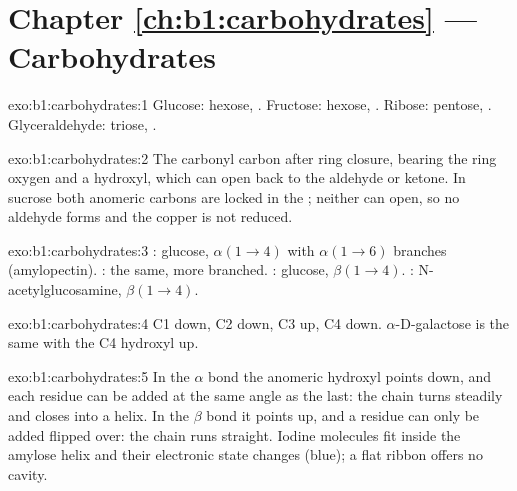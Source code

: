 \section*{Chapter \ref{ch:b1:carbohydrates} --- Carbohydrates}

\begin{solution}{exo:b1:carbohydrates:1}
Glucose: hexose, . Fructose: hexose, . Ribose: pentose,
. Glyceraldehyde: triose, .
\end{solution}

\begin{solution}{exo:b1:carbohydrates:2}
The carbonyl carbon after ring closure, bearing the ring oxygen and a
hydroxyl, which can open back to the aldehyde or ketone. In sucrose
both anomeric carbons are locked in the ; neither can
open, so no aldehyde forms and the copper is not reduced.
\end{solution}

\begin{solution}{exo:b1:carbohydrates:3}
: glucose, $\alpha(1{\to}4)$ with $\alpha(1{\to}6)$ branches
(amylopectin). : the same, more branched. : glucose,
$\beta(1{\to}4)$. : N-acetylglucosamine, $\beta(1{\to}4)$.
\end{solution}

\begin{solution}{exo:b1:carbohydrates:4}
C1 down, C2 down, C3 up, C4 down. $\alpha$-D-galactose is the same with
the C4 hydroxyl up.
\end{solution}

\begin{solution}{exo:b1:carbohydrates:5}
In the $\alpha$ bond the anomeric hydroxyl points down, and each
residue can be added at the same angle as the last: the chain turns
steadily and closes into a helix. In the $\beta$ bond it points up, and
a residue can only be added flipped over: the chain runs straight.
Iodine molecules fit inside the amylose helix and their electronic
state changes (blue); a flat ribbon offers no cavity.
\end{solution}


